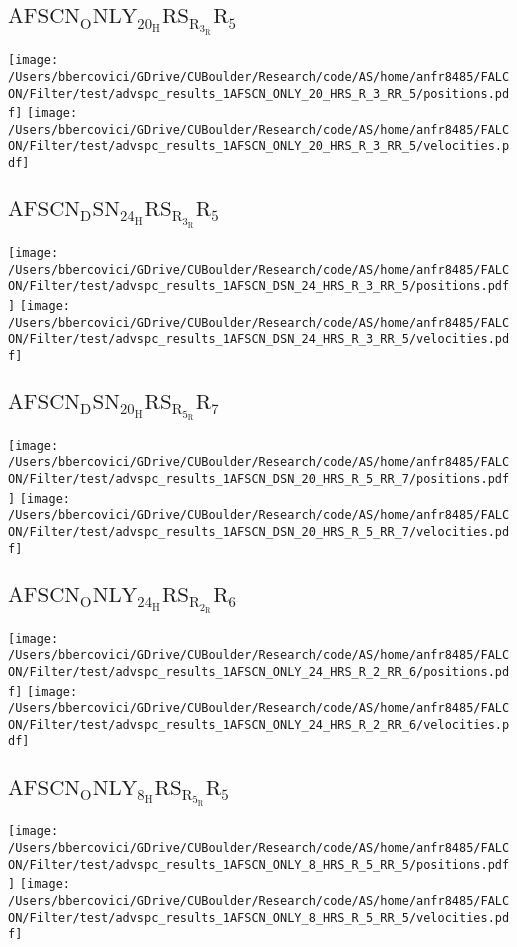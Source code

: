 \subsection{$\mathrm{AFSCN_ONLY_20_HRS_R_3_RR_5}$}
\texttt{[image: /Users/bbercovici/GDrive/CUBoulder/Research/code/AS/home/anfr8485/FALCON/Filter/test/advspc\_results\_1AFSCN\_ONLY\_20\_HRS\_R\_3\_RR\_5/positions.pdf]}
\texttt{[image: /Users/bbercovici/GDrive/CUBoulder/Research/code/AS/home/anfr8485/FALCON/Filter/test/advspc\_results\_1AFSCN\_ONLY\_20\_HRS\_R\_3\_RR\_5/velocities.pdf]}
\subsection{$\mathrm{AFSCN_DSN_24_HRS_R_3_RR_5}$}
\texttt{[image: /Users/bbercovici/GDrive/CUBoulder/Research/code/AS/home/anfr8485/FALCON/Filter/test/advspc\_results\_1AFSCN\_DSN\_24\_HRS\_R\_3\_RR\_5/positions.pdf]}
\texttt{[image: /Users/bbercovici/GDrive/CUBoulder/Research/code/AS/home/anfr8485/FALCON/Filter/test/advspc\_results\_1AFSCN\_DSN\_24\_HRS\_R\_3\_RR\_5/velocities.pdf]}
\subsection{$\mathrm{AFSCN_DSN_20_HRS_R_5_RR_7}$}
\texttt{[image: /Users/bbercovici/GDrive/CUBoulder/Research/code/AS/home/anfr8485/FALCON/Filter/test/advspc\_results\_1AFSCN\_DSN\_20\_HRS\_R\_5\_RR\_7/positions.pdf]}
\texttt{[image: /Users/bbercovici/GDrive/CUBoulder/Research/code/AS/home/anfr8485/FALCON/Filter/test/advspc\_results\_1AFSCN\_DSN\_20\_HRS\_R\_5\_RR\_7/velocities.pdf]}
\subsection{$\mathrm{AFSCN_ONLY_24_HRS_R_2_RR_6}$}
\texttt{[image: /Users/bbercovici/GDrive/CUBoulder/Research/code/AS/home/anfr8485/FALCON/Filter/test/advspc\_results\_1AFSCN\_ONLY\_24\_HRS\_R\_2\_RR\_6/positions.pdf]}
\texttt{[image: /Users/bbercovici/GDrive/CUBoulder/Research/code/AS/home/anfr8485/FALCON/Filter/test/advspc\_results\_1AFSCN\_ONLY\_24\_HRS\_R\_2\_RR\_6/velocities.pdf]}
\subsection{$\mathrm{AFSCN_ONLY_8_HRS_R_5_RR_5}$}
\texttt{[image: /Users/bbercovici/GDrive/CUBoulder/Research/code/AS/home/anfr8485/FALCON/Filter/test/advspc\_results\_1AFSCN\_ONLY\_8\_HRS\_R\_5\_RR\_5/positions.pdf]}
\texttt{[image: /Users/bbercovici/GDrive/CUBoulder/Research/code/AS/home/anfr8485/FALCON/Filter/test/advspc\_results\_1AFSCN\_ONLY\_8\_HRS\_R\_5\_RR\_5/velocities.pdf]}
